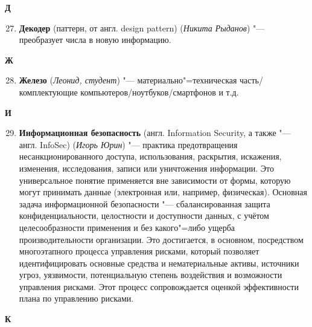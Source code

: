 \begin{flushleft} \large\textbf{Д} \end{flushleft}

\begin{enumerate}
\setcounter{enumi}{26}
 
     \item \textbf{Декодер}  (паттерн, от англ. design pattern) (\textit{Никита Рыданов}) "--- 
      преобразует числа в новую информацию.
     
\end{enumerate}

\begin{flushleft} \large\textbf{Ж} \end{flushleft}

\begin{enumerate}
\setcounter{enumi}{27}
\item \textbf{Железо} (\textit{Леонид, студент}) "---
      материально"=техническая часть/комплектующие компьютеров/ноутбуков/смартфонов и т.д.

\end{enumerate}

\begin{flushleft} \large\textbf{И} \end{flushleft}

\begin{enumerate}
\setcounter{enumi}{28}
\item \textbf{Информационная безопасность} (англ. Information Security, а также "--- англ. InfoSec) (\textit{Игорь Юрин}) "--- 
    практика предотвращения несанкционированного доступа, использования, раскрытия, искажения, изменения, исследования, записи или уничтожения информации. Это универсальное понятие применяется вне зависимости от формы, которую могут принимать данные (электронная или, например, физическая). Основная задача информационной безопасности "--- сбалансированная защита конфиденциальности, целостности и доступности данных, с учётом целесообразности применения и без какого"=либо ущерба производительности организации. Это достигается, в основном, посредством многоэтапного процесса управления рисками, который позволяет идентифицировать основные средства и нематериальные активы, источники угроз, уязвимости, потенциальную степень воздействия и возможности управления рисками. Этот процесс сопровождается оценкой эффективности плана по управлению рисками.
\end{enumerate}

\begin{flushleft} \large\textbf{К} \end{flushleft}

